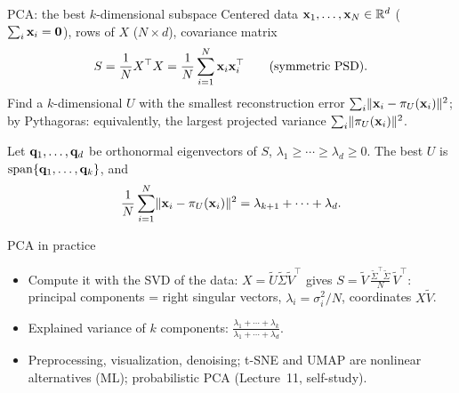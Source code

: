\documentclass[aspectratio=1610,11pt]{beamer}
\begin{document}

\begin{frame}{PCA: the best $k$-dimensional subspace}
    \small
    Centered data $\mathbf{x}_1, \ldots, \mathbf{x}_N \in \mathbb{R}^d$ ($\sum_i\mathbf{x}_i = \mathbf{0}$), rows of $X$ ($N \times d$), covariance matrix
    \[S = \frac{1}{N}X^\top X = \frac{1}{N}\sum_{i=1}^N\mathbf{x}_i\mathbf{x}_i^\top \qquad \text{(symmetric PSD).}\]
    Find a $k$-dimensional $U$ with the smallest reconstruction error $\sum_i\lVert \mathbf{x}_i - \pi_U(\mathbf{x}_i) \rVert^2$; \\
    by Pythagoras: equivalently, the largest projected variance $\sum_i\lVert \pi_U(\mathbf{x}_i) \rVert^2$.
    \begin{theorem}
        \small Let $\mathbf{q}_1, \ldots, \mathbf{q}_d$ be orthonormal eigenvectors of $S$, $\lambda_1 \geq \cdots \geq \lambda_d \geq 0$. The best $U$ is $\operatorname{span}\{\mathbf{q}_1, \ldots, \mathbf{q}_k\}$, and
        \[\frac{1}{N}\sum_{i=1}^N\lVert \mathbf{x}_i - \pi_U(\mathbf{x}_i) \rVert^2 = \lambda_{k+1} + \cdots + \lambda_d.\]
    \end{theorem}
\end{frame}


\begin{frame}{PCA in practice}
    \centering{}
    \\[0.1em]
    \raggedright\small
    \begin{itemize}
        \item Compute it with the SVD of the data: $X = \tilde U\tilde\Sigma\tilde V^\top$ gives $S = \tilde V\,\frac{\tilde\Sigma^\top\tilde\Sigma}{N}\,\tilde V^\top$: principal components = right singular vectors, $\lambda_i = \sigma_i^2/N$, coordinates $X\tilde V$.
        \item Explained variance of $k$ components: $\frac{\lambda_1 + \cdots + \lambda_k}{\lambda_1 + \cdots + \lambda_d}$.
        \item \textcolor{mlcolor}{Preprocessing, visualization, denoising; t-SNE and UMAP are nonlinear alternatives (ML); probabilistic PCA (Lecture~11, self-study).}
    \end{itemize}
\end{frame}
\end{document}
